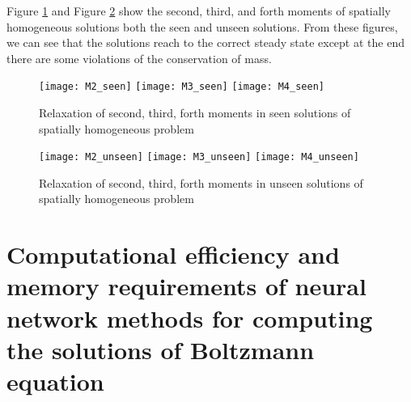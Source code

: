 \documentclass{article}
\begin{document}
Figure \ref{fig:Moments_seen} and Figure \ref{fig:Moments_unseen} show the second, third, and forth moments of spatially homogeneous solutions both the seen and unseen solutions. From these figures, we can see that the solutions reach to the correct steady state except at the end there are some violations of the conservation of mass.

\begin{figure}[h]
	\texttt{[image: M2\_seen]}
	\hfill
	\texttt{[image: M3\_seen]}
	\hfill
	\texttt{[image: M4\_seen]}
	\caption{Relaxation of second, third, forth moments in seen solutions of spatially homogeneous problem}
	\label{fig:Moments_seen}	
\end{figure}

\begin{figure}[h]
	\texttt{[image: M2\_unseen]}
	\hfill
	\texttt{[image: M3\_unseen]}
	\hfill
	\texttt{[image: M4\_unseen]}
	\caption{Relaxation of second, third, forth moments in unseen solutions of spatially homogeneous problem}
	\label{fig:Moments_unseen}	
\end{figure}

\section{Computational efficiency and memory requirements of neural network methods for computing the solutions of Boltzmann equation } \label{efficiency}
\end{document}
